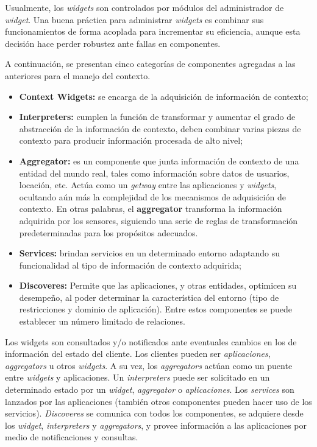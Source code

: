 \begin{itemize}
Usualmente, los \textit{widgets} son controlados por módulos del administrador de \textit{widget}. Una buena práctica para administrar \textit{widgets} es combinar sus funcionamientos de forma acoplada para incrementar su eficiencia, aunque esta decisión hace perder robustez ante fallas en componentes.

A continuación, se presentan cinco categorías de componentes agregadas a las anteriores para el manejo del contexto.

\begin{itemize}

 \item \textbf{Context Widgets:} se encarga de la adquisición de información de contexto; 

\item \textbf{Interpreters:} cumplen la función de transformar y aumentar el grado de abstracción de la información de contexto, deben combinar varias piezas de contexto para producir información procesada de alto nivel;


\item \textbf{Aggregator:} es un componente que junta información de contexto de una entidad del mundo real, tales como información sobre datos de usuarios, locación, etc. Actúa como un \textit{getway} entre las aplicaciones y  \textit{widgets}, ocultando aún más la complejidad de los mecanismos de adquisición de contexto. En otras palabras, el \textbf{aggregator} transforma la información adquirida por los sensores, siguiendo una serie de reglas de transformación predeterminadas para los propósitos adecuados.

\item \textbf{Services:} brindan servicios en un determinado entorno adaptando su funcionalidad al tipo de información de contexto adquirida; 

\item \textbf{Discoveres:} Permite que las aplicaciones, y otras entidades, optimicen su desempeño, al poder determinar la característica del entorno (tipo de restricciones y dominio de aplicación). Entre estos componentes se puede establecer un número limitado de relaciones.

\end{itemize}

Los widgets son consultados y/o notificados ante eventuales cambios en los de información del estado del cliente. Los clientes pueden ser \textit{aplicaciones}, \textit{aggregators} u otros \textit{widgets}. A su vez, los \textit{aggregators} actúan como un puente entre \textit{widgets} y aplicaciones. Un \textit{interpreters} puede ser solicitado en un determinado estado por un \textit{widget}, \textit{aggregator} o \textit{aplicaciones}. Los \textit{services} son lanzados por las aplicaciones (también otros componentes pueden hacer uso de los servicios). \textit{Discoveres} se comunica con todos los componentes, se adquiere desde los \textit{widget}, \textit{interpreters} y \textit{aggregators}, y provee información a las aplicaciones por medio de notificaciones y consultas.


\end{itemize}
